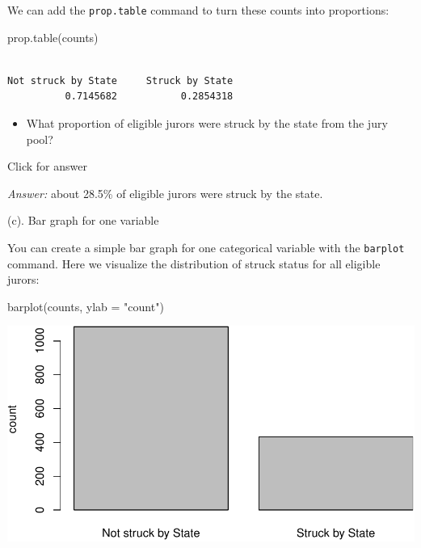 \documentclass[
]{book}
\newenvironment{Shaded}{\begin{snugshade}}{\end{snugshade}}
\newcommand{\AttributeTok}[1]{\textcolor[rgb]{0.77,0.63,0.00}{#1}}
\newcommand{\FunctionTok}[1]{\textcolor[rgb]{0.00,0.00,0.00}{#1}}
\newcommand{\NormalTok}[1]{#1}
\newcommand{\StringTok}[1]{\textcolor[rgb]{0.31,0.60,0.02}{#1}}
\providecommand{\tightlist}{%
  \setlength{\itemsep}{0pt}\setlength{\parskip}{0pt}}
\begin{document}
We can add the \texttt{prop.table} command to turn these counts into proportions:

\begin{Shaded}
\begin{Highlighting}[]
\FunctionTok{prop.table}\NormalTok{(counts)}
\end{Highlighting}
\end{Shaded}

\begin{verbatim}

Not struck by State     Struck by State 
          0.7145682           0.2854318 
\end{verbatim}

\begin{itemize}
\tightlist
\item
  What proportion of eligible jurors were struck by the state from the jury pool?
\end{itemize}

Click for answer

\emph{Answer:} about 28.5\% of eligible jurors were struck by the state.

(c). Bar graph for one variable

You can create a simple bar graph for one categorical variable with the \texttt{barplot} command. Here we visualize the distribution of struck status for all eligible jurors:

\begin{Shaded}
\begin{Highlighting}[]
\FunctionTok{barplot}\NormalTok{(counts, }\AttributeTok{ylab =} \StringTok{"count"}\NormalTok{)}
\end{Highlighting}
\end{Shaded}

\includegraphics[width=1\linewidth]{Class_Activity_4_files/figure-latex/unnamed-chunk-8-1}
\end{document}
